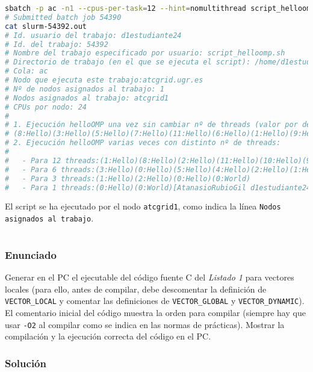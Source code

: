\begin{lstlisting}[language=sh]
sbatch -p ac -n1 --cpus-per-task=12 --hint=nomultithread script_helloomp.sh
# Submitted batch job 54390
cat slurm-54392.out
# Id. usuario del trabajo: d1estudiante24
# Id. del trabajo: 54392
# Nombre del trabajo especificado por usuario: script_helloomp.sh
# Directorio de trabajo (en el que se ejecuta el script): /home/d1estudiante24/bp0/ejer3
# Cola: ac
# Nodo que ejecuta este trabajo:atcgrid.ugr.es
# Nº de nodos asignados al trabajo: 1
# Nodos asignados al trabajo: atcgrid1
# CPUs por nodo: 24
#
# 1. Ejecución helloOMP una vez sin cambiar nº de threads (valor por defecto):
# (8:Hello)(3:Hello)(5:Hello)(7:Hello)(11:Hello)(6:Hello)(1:Hello)(9:Hello)(4:Hello)(0:Hello)(2:Hello)(10:Hello)(0:World)
# 2. Ejecución helloOMP varias veces con distinto nº de threads:
#
#   - Para 12 threads:(1:Hello)(8:Hello)(2:Hello)(11:Hello)(10:Hello)(9:Hello)(0:Hello)(7:Hello)(5:Hello)(4:Hello)(6:Hello)(3:Hello)(0:World)
#   - Para 6 threads:(3:Hello)(0:Hello)(5:Hello)(4:Hello)(2:Hello)(1:Hello)(0:World)
#   - Para 3 threads:(1:Hello)(2:Hello)(0:Hello)(0:World)
#   - Para 1 threads:(0:Hello)(0:World)[AtanasioRubioGil d1estudiante24@atcgrid:~/bp0/ejer3] 2020-06-11 jueves
\end{lstlisting}

El script se ha ejecutado por el nodo \texttt{atcgrid1}, como indica la línea \texttt{Nodos asignados al trabajo}.

\pagebreak

\section{}\label{ej1-5}

\subsubsection{Enunciado}

Generar en el PC el ejecutable del código fuente C del \textit{Listado 1} para vectores locales (para ello, antes de compilar, debe descomentar la definición de \texttt{VECTOR\_LOCAL} y comentar las definiciones de \texttt{VECTOR\_GLOBAL} y \texttt{VECTOR\_DYNAMIC}).
El comentario inicial del código muestra la orden para compilar (siempre hay que usar \texttt{-O2} al compilar como se indica en las normas de prácticas).
Mostrar la compilación y la ejecución correcta del código en el PC\@.

\subsubsection{Solución}

